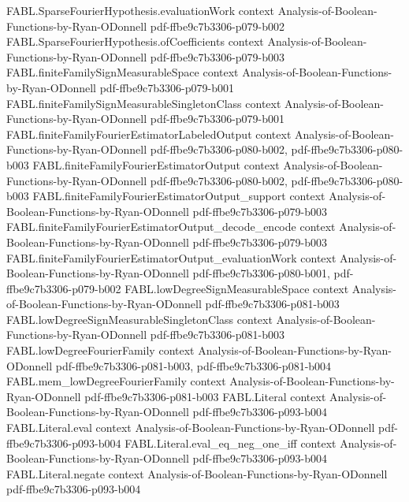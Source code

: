 \begin{theorem}
\proofstep
  {FABL.SparseFourierHypothesis.evaluationWork}
  {context}
  {Analysis-of-Boolean-Functions-by-Ryan-ODonnell}
  {pdf-ffbe9c7b3306-p079-b002}
\proofstep
  {FABL.SparseFourierHypothesis.ofCoefficients}
  {context}
  {Analysis-of-Boolean-Functions-by-Ryan-ODonnell}
  {pdf-ffbe9c7b3306-p079-b003}
\proofstep
  {FABL.finiteFamilySignMeasurableSpace}
  {context}
  {Analysis-of-Boolean-Functions-by-Ryan-ODonnell}
  {pdf-ffbe9c7b3306-p079-b001}
\proofstep
  {FABL.finiteFamilySignMeasurableSingletonClass}
  {context}
  {Analysis-of-Boolean-Functions-by-Ryan-ODonnell}
  {pdf-ffbe9c7b3306-p079-b001}
\proofstep
  {FABL.finiteFamilyFourierEstimatorLabeledOutput}
  {context}
  {Analysis-of-Boolean-Functions-by-Ryan-ODonnell}
  {pdf-ffbe9c7b3306-p080-b002,
    pdf-ffbe9c7b3306-p080-b003}
\proofstep
  {FABL.finiteFamilyFourierEstimatorOutput}
  {context}
  {Analysis-of-Boolean-Functions-by-Ryan-ODonnell}
  {pdf-ffbe9c7b3306-p080-b002,
    pdf-ffbe9c7b3306-p080-b003}
\proofstep
  {FABL.finiteFamilyFourierEstimatorOutput_support}
  {context}
  {Analysis-of-Boolean-Functions-by-Ryan-ODonnell}
  {pdf-ffbe9c7b3306-p079-b003}
\proofstep
  {FABL.finiteFamilyFourierEstimatorOutput_decode_encode}
  {context}
  {Analysis-of-Boolean-Functions-by-Ryan-ODonnell}
  {pdf-ffbe9c7b3306-p079-b003}
\proofstep
  {FABL.finiteFamilyFourierEstimatorOutput_evaluationWork}
  {context}
  {Analysis-of-Boolean-Functions-by-Ryan-ODonnell}
  {pdf-ffbe9c7b3306-p080-b001,
    pdf-ffbe9c7b3306-p079-b002}
\proofstep
  {FABL.lowDegreeSignMeasurableSpace}
  {context}
  {Analysis-of-Boolean-Functions-by-Ryan-ODonnell}
  {pdf-ffbe9c7b3306-p081-b003}
\proofstep
  {FABL.lowDegreeSignMeasurableSingletonClass}
  {context}
  {Analysis-of-Boolean-Functions-by-Ryan-ODonnell}
  {pdf-ffbe9c7b3306-p081-b003}
\proofstep
  {FABL.lowDegreeFourierFamily}
  {context}
  {Analysis-of-Boolean-Functions-by-Ryan-ODonnell}
  {pdf-ffbe9c7b3306-p081-b003,
    pdf-ffbe9c7b3306-p081-b004}
\proofstep
  {FABL.mem_lowDegreeFourierFamily}
  {context}
  {Analysis-of-Boolean-Functions-by-Ryan-ODonnell}
  {pdf-ffbe9c7b3306-p081-b003}
\proofstep
  {FABL.Literal}
  {context}
  {Analysis-of-Boolean-Functions-by-Ryan-ODonnell}
  {pdf-ffbe9c7b3306-p093-b004}
\proofstep
  {FABL.Literal.eval}
  {context}
  {Analysis-of-Boolean-Functions-by-Ryan-ODonnell}
  {pdf-ffbe9c7b3306-p093-b004}
\proofstep
  {FABL.Literal.eval_eq_neg_one_iff}
  {context}
  {Analysis-of-Boolean-Functions-by-Ryan-ODonnell}
  {pdf-ffbe9c7b3306-p093-b004}
\proofstep
  {FABL.Literal.negate}
  {context}
  {Analysis-of-Boolean-Functions-by-Ryan-ODonnell}
  {pdf-ffbe9c7b3306-p093-b004}

\end{theorem}
